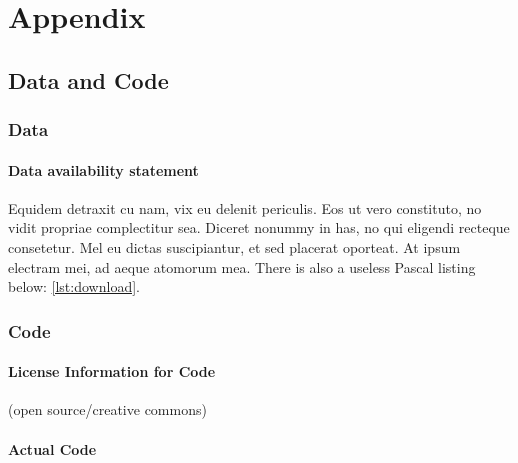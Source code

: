 \normalsize %
\setlength{\parindent}{0cm}%
\setlength{\leftskip}{0cm}%
\appendix
\cleardoublepage
\part{Appendix}


\chapter{Data and Code}

\section{Data}

\subsection{Data availability statement}

Equidem detraxit cu nam, vix eu delenit periculis. Eos ut vero
constituto, no vidit propriae complectitur sea. Diceret nonummy in
has, no qui eligendi recteque consetetur. Mel eu dictas suscipiantur,
et sed placerat oporteat. At ipsum electram mei, ad aeque atomorum
mea. There is also a useless Pascal listing below: \autoref{lst:download}.

\section{Code}

\subsection{License Information for Code}
(open source/creative commons)

\subsection{Actual Code}


